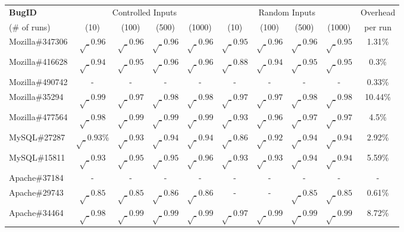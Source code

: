 \begin{table}[h!]
  \centering
  \scriptsize
  \newcommand{\Yes}[1]{\checkmark{}$_#1$}
  \newcommand{\No}[0]{-}
  \begin{tabular}{lccccccccc}
    \toprule     
   {\bf BugID}                   &  \multicolumn{4}{c}{Controlled Inputs}            &     \multicolumn{4}{c}{Random Inputs}          & Overhead \\
                           
    \cmidrule(lr){2-5}
    \cmidrule(lr){6-9}
    (\# of runs)                 &  (10)     &   (100)    &    (500)    & (1000)     &  (10)     &   (100)    &    (500)    & (1000)   &   per run\\
    \midrule 

    Mozilla\#347306   & $\surd_{0.96}$ & $\surd_{0.96}$  & $\surd_{0.96}$ & $\surd_{0.96}$ & $\surd_{0.95}$ & $\surd_{0.96}$ & $\surd_{0.96}$ & $\surd_{0.95}$ &  1.31\% \\
    Mozilla\#416628   & $\surd_{0.94}$ & $\surd_{0.95}$  & $\surd_{0.96}$  & $\surd_{0.96}$ & $\surd_{0.88}$ & $\surd_{0.94}$ & $\surd_{0.95}$ & $\surd_{0.95}$ & 0.3\% \\
    Mozilla\#490742   &  -  & -  & - & - & - & - & - & - & 0.33\% \\
    Mozilla\#35294    &  $\surd_{0.99}$  & $\surd_{0.97}$ & $\surd_{0.98}$ & $\surd_{0.98}$ & $\surd_{0.97}$ & $\surd_{0.97}$ & $\surd_{0.98}$ & $\surd_{0.98}$ & 10.44\% \\
    Mozilla\#477564   &  $\surd_{0.98}$  & $\surd_{0.99}$ & $\surd_{0.99}$ & $\surd_{0.99}$ & $\surd_{0.93}$ & $\surd_{0.96}$ & $\surd_{0.97}$ & $\surd_{0.97}$ & 4.5\% \\
    \midrule
    MySQL\#27287      &  $\surd_{0.93}$\%  & $\surd_{0.93}$ & $\surd_{0.94}$ & $\surd_{0.94}$ & $\surd_{0.86}$ & $\surd_{0.92}$ & $\surd_{0.94}$ & $\surd_{0.94}$& 2.92\% \\
    MySQL\#15811      &  $\surd_{0.93}$  & $\surd_{0.95}$ & $\surd_{0.95}$ & $\surd_{0.96}$ & $\surd_{0.93}$ & $\surd_{0.93}$ & $\surd_{0.94}$ & $\surd_{0.94}$ & 5.59\% \\
    \midrule
    Apache\#37184     &  -  & -  & - & - & - & - & - & - & - \\
    Apache\#29743     & $\surd_{0.85}$  & $\surd_{0.85}$ & $\surd_{0.86}$ & $\surd_{0.86}$ & - & - & $\surd_{0.85}$ & $\surd_{0.85}$ & 0.61\% \\
    Apache\#34464     & $\surd_{0.98}$  & $\surd_{0.99}$ & $\surd_{0.99}$ & $\surd_{0.99}$ & $\surd_{0.97}$ & $\surd_{0.99}$ & $\surd_{0.99}$ & $\surd_{0.99}$ & 8.72\% \\

\end{tabular}
\end{table}
